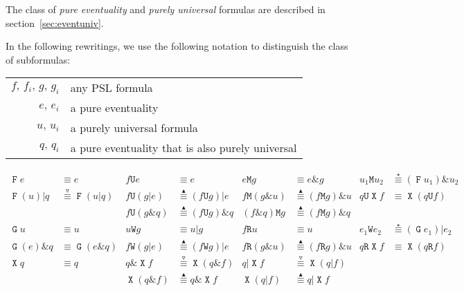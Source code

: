 \documentclass[a4paper,twoside,10pt,DIV=12]{scrreprt}
\DeclareMathOperator{\F}{\texttt{F}}
\DeclareMathOperator{\G}{\texttt{G}}
\newcommand{\U}{\mathbin{\texttt{U}}}
\newcommand{\R}{\mathbin{\texttt{R}}}
\DeclareMathOperator{\X}{\texttt{X}}
\newcommand{\M}{\mathbin{\texttt{M}}}
\newcommand{\W}{\mathbin{\texttt{W}}}
\newcommand{\OR}{\mathbin{\texttt{|}}}
\newcommand{\AND}{\mathbin{\texttt{\&}}}
\newcommand{\0}{\texttt{0}}
\newcommand{\1}{\texttt{1}}
\newcommand{\equiV}{\stackrel{\star}{\equiv}}
\newcommand{\equivEU}{\stackrel{\blacktriangleup}{\equiv}}
\newcommand{\equivNeu}{\stackrel{\smalltriangledown}{\equiv}}
\begin{document}
The class of \textit{pure eventuality} and \textit{purely universal}
formulas are described in section~\ref{sec:eventuniv}.

In the following rewritings, we use the following
notation to distinguish the class of subformulas:

\begin{center}
\begin{tabular}{rl}
\toprule
$f,\,f_i,\,g,\,g_i$ & any PSL formula                                  \\
$e,\,e_i$           & a pure eventuality                               \\
$u,\,u_i$           & a purely universal formula                       \\
$q,\,q_i$           & a pure eventuality that is also purely universal \\
\bottomrule
\end{tabular}
\end{center}

\begin{align*}
  \F e        & \equiv e             & f \U e         & \equiv e                & e \M g        & \equiv e\AND g          & u_1 \M u_2 & \equiV (\F u_1) \AND u_2 \\
  \F(u)\OR q  & \equivNeu \F(u\OR q) & f \U (g\OR e)  & \equivEU (f \U g)\OR e  & f\M (g\AND u) & \equivEU (f \M g)\AND u & q \U\X f   & \equiv \X(q \U f)        \\
              &                      & f \U (g\AND q) & \equivEU (f \U g)\AND q & (f\AND q)\M g & \equivEU (f \M g)\AND q                                         \\
  \G u        & \equiv u             & u \W g         & \equiv u\OR g           & f \R u        & \equiv u                & e_1 \W e_2 & \equiV (\G e_1) \OR e_2  \\
  \G(e)\AND q & \equiv \G(e\AND q)   & f \W (g\OR e)  & \equivEU (f \W g)\OR e  & f\R (g\AND u) & \equivEU (f \R g)\AND u & q \R\X f   & \equiv \X(q \R f)        \\
  \X q        & \equiv q             & q \AND \X f    & \equivNeu \X(q \AND f)  & q\OR \X f     & \equivNeu \X(q \OR f)                                           \\
              &                      & \X(q \AND f)   & \equivEU q \AND \X f    & \X(q \OR f)   & \equivEU q\OR \X f                                              \\
\end{align*}
\end{document}
